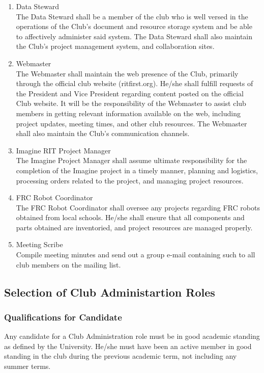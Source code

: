 \documentclass[english,11pt]{article}
\begin{document}
\begin{enumerate}[label=\Alph*.]
    \item {\large Data Steward} \\
            The Data Steward shall be a member of the club who is well versed in the operations of the Club's document and resource storage system and be able to affectively administer said system.
            The Data Steward shall also maintain the Club's project management system, and collaboration sites.
    \item {\large Webmaster} \\
            The Webmaster shall maintain the web presence of the Club, primarily through the official club website (ritfirst.org).
            He/she shall fulfill requests of the President and Vice President regarding content posted on the official Club website.
            It will be the responsibility of the Webmaster to assist club members in getting relevant information available on the web, including project updates, meeting times, and other club resources.
            The Webmaster shall also maintain the Club's communication channels.
    \item {\large Imagine RIT Project Manager} \\
            The Imagine Project Manager shall assume ultimate responsibility for the completion of the Imagine project in a timely manner, planning and logistics, processing orders related to the project, and managing project resources.
    \item {\large FRC Robot Coordinator} \\
            The FRC Robot Coordinator shall oversee any projects regarding FRC robots obtained from local schools. He/she shall ensure that all components and parts obtained are inventoried, and project resources are managed properly.
    \item {\large Meeting Scribe} \\
            Compile meeting minutes and send out a group e-mail containing such to all club members on the mailing list.
\end{enumerate}

\subsection{Selection of Club Administartion Roles} \label{sect:cadmin:selection}
\subsubsection{Qualifications for Candidate} \label{subsect:cadmin:selection:qualifications}
Any candidate for a Club Administration role must be in good academic standing as defined by the University.
He/she must have been an active member in good standing in the club during the previous academic term, not including any summer terms.
\end{document}
